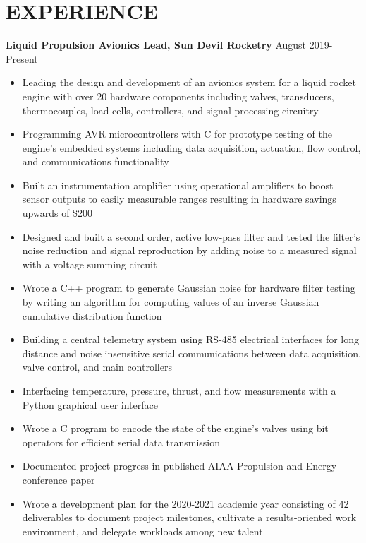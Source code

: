 \documentclass{article}
\begin{document}
\section{EXPERIENCE}
\textbf{Liquid Propulsion Avionics Lead, Sun Devil Rocketry}
\hfill
\vspace{0.5em}
August 2019-Present
\begin{itemize}
	\item{Leading the design and development of an avionics system for a liquid rocket engine with over 20 hardware components including valves, transducers, thermocouples, load cells, controllers, and signal processing circuitry}
	\item{Programming AVR microcontrollers with C for prototype testing of the engine's embedded systems including data acquisition, actuation, flow control, and communications functionality}
	\item{Built an instrumentation amplifier using operational amplifiers to boost sensor outputs to easily measurable ranges resulting in hardware savings upwards of \$200}
	\item{Designed and built a second order, active low-pass filter and tested the filter's noise reduction and signal reproduction by adding noise to a measured signal with a voltage summing circuit}
	\item{Wrote a C++ program to generate Gaussian noise for hardware filter testing by writing an algorithm for computing values of an inverse Gaussian cumulative distribution function}
	\item{Building a central telemetry system using RS-485 electrical interfaces for long distance and noise insensitive serial communications between data acquisition, valve control, and main controllers}
	\item{Interfacing temperature, pressure, thrust, and flow measurements with a Python graphical user interface}
	\item{Wrote a C program to encode the state of the engine's valves using bit operators for efficient serial data transmission}
	\item{Documented project progress in published AIAA Propulsion and Energy conference paper}
	\item{Wrote a development plan for the 2020-2021 academic year consisting of 42 deliverables to document project milestones, cultivate a results-oriented work environment, and delegate workloads among new talent}	
\end{itemize}
\end{document}

